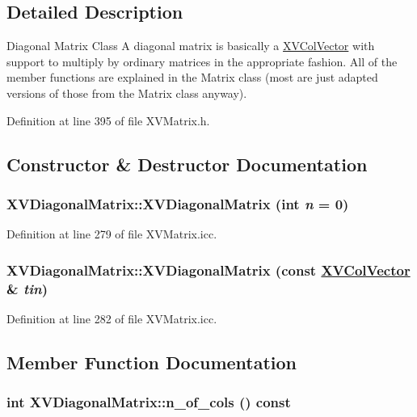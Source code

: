 \subsection{Detailed Description}
Diagonal Matrix Class A diagonal matrix is basically a \hyperlink{class_XVColVector}{XVCol\-Vector} with support to multiply by ordinary matrices in the appropriate fashion. All of the member functions are explained in the Matrix class (most are just adapted versions of those from the Matrix class anyway).





Definition at line 395 of file XVMatrix.h.

\subsection{Constructor \& Destructor Documentation}
\label{XVDiagonalMatrix_a0}
\hypertarget{class_XVDiagonalMatrix_a0}{
\subsubsection[XVDiagonalMatrix]{\setlength{\rightskip}{0pt plus 5cm}XVDiagonal\-Matrix::XVDiagonal\-Matrix (int {\em n} = 0)}}




Definition at line 279 of file XVMatrix.icc.\label{XVDiagonalMatrix_a1}
\hypertarget{class_XVDiagonalMatrix_a1}{
\subsubsection[XVDiagonalMatrix]{\setlength{\rightskip}{0pt plus 5cm}XVDiagonal\-Matrix::XVDiagonal\-Matrix (const \hyperlink{class_XVColVector}{XVCol\-Vector} \& {\em tin})}}




Definition at line 282 of file XVMatrix.icc.

\subsection{Member Function Documentation}
\label{XVDiagonalMatrix_a2}
\hypertarget{class_XVDiagonalMatrix_a2}{
\subsubsection[n_of_cols]{\setlength{\rightskip}{0pt plus 5cm}int XVDiagonal\-Matrix::n\_\-of\_\-cols () const}}




